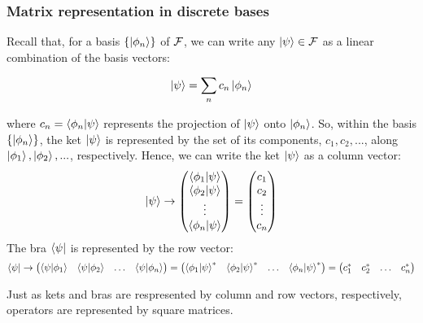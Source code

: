 \subsubsection{Matrix representation in discrete bases}

Recall that, for a basis $\{\ket{\phi_n}\}$ of $\mathcal{F}$, we can write any $\ket{\psi}\in\mathcal{F}$ as a linear combination of the basis vectors:

\begin{equation}
    \ket{\psi} = \sum_n c_n\ket{\phi_n}
\end{equation}

where $c_n = \braket{\phi_n|\psi}$ represents the projection of $\ket{\psi}$ onto $\ket{\phi_n}$. So, within the basis $\{\ket{\phi_n}\}$, the ket $\ket{\psi}$ is represented by the set of its components, $c_1, c_2, ...$, along $\ket{\phi_1}, \ket{\phi_2}, ...$, respectively. Hence, we can write the ket $\ket{\psi}$ as a column vector:
\begin{equation}
    \ket{\psi} \to \begin{pmatrix}
        \braket{\phi_1|\psi} \\ \braket{\phi_2|\psi} \\ \vdots \\ \braket{\phi_n|\psi}
    \end{pmatrix} = \begin{pmatrix}
        c_1 \\ c_2 \\ \vdots \\ c_n
    \end{pmatrix}
\end{equation}
The bra $\bra{\psi}$ is represented by the row vector:
\begin{equation}
    \bra{\psi} \to \begin{pmatrix}
        \braket{\psi|\phi_1} & \braket{\psi|\phi_2} & \hdots & \braket{\psi|\phi_n}
    \end{pmatrix} = \begin{pmatrix}
        \braket{\phi_1|\psi}^* & \braket{\phi_2|\psi}^* & \hdots & \braket{\phi_n|\psi}^* 
    \end{pmatrix} =
    \begin{pmatrix}
        c_1^* & c_2^* & \hdots & c_n^*
    \end{pmatrix}
\end{equation}

Just as kets and bras are respresented by column and row vectors, respectively, operators are represented by square matrices.

